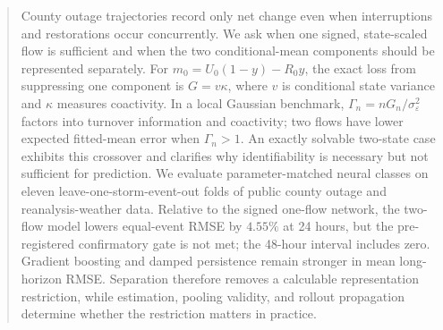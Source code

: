 \documentclass[twoside]{article}
\theoremstyle{plain}
\theoremstyle{definition}
\theoremstyle{remark}
\begin{document}


\begin{abstract}
\setlength{\emergencystretch}{1em}
County outage trajectories record only net change even when interruptions and restorations occur concurrently. We ask when one signed, state-scaled flow is sufficient and when the two conditional-mean components should be represented separately. For $m_0=U_0(1-y)-R_0y$, the exact loss from suppressing one component is $G=v\kappa$, where $v$ is conditional state variance and $\kappa$ measures coactivity. In a local Gaussian benchmark, $\Gamma_n=nG_n/\sigma_\varepsilon^2$ factors into turnover information and coactivity; two flows have lower expected fitted-mean error when $\Gamma_n>1$. An exactly solvable two-state case exhibits this crossover and clarifies why identifiability is necessary but not sufficient for prediction. We evaluate parameter-matched neural classes on eleven leave-one-storm-event-out folds of public county outage and reanalysis-weather data. Relative to the signed one-flow network, the two-flow model lowers equal-event RMSE by $4.55\%$ at 24 hours, but the pre-registered confirmatory gate is not met; the 48-hour interval includes zero. Gradient boosting and damped persistence remain stronger in mean long-horizon RMSE. Separation therefore removes a calculable representation restriction, while estimation, pooling validity, and rollout propagation determine whether the restriction matters in practice.
\end{abstract}









\clearpage
\appendix
\onecolumn
{}

\end{document}
